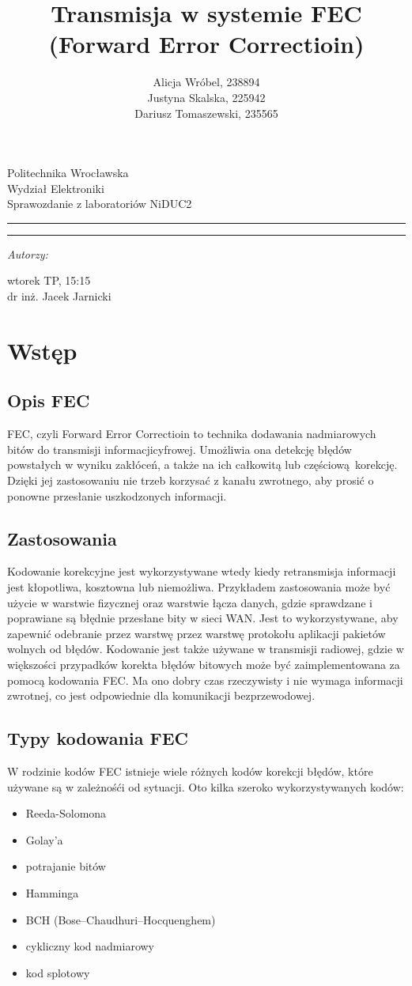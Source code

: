 \documentclass[12pt,a4paper,notitlepage]{report}
\author{Alicja Wróbel, 238894\\
    Justyna Skalska, 225942\\
    Dariusz Tomaszewski, 235565}
\title{Transmisja w systemie FEC\\
    (Forward Error Correctioin)}
\makeatletter
\newcommand{\linia}{\rule{\linewidth}{0.4mm}}
\renewcommand{\maketitle}{\begin{titlepage}
        \vspace*{1cm}
        \begin{center}\small
        Politechnika Wrocławska\\
        Wydział Elektroniki\\
        Sprawozdanie z laboratoriów NiDUC2
        \end{center}
        \vspace{3cm}
        \noindent\linia
        \begin{center}
          \LARGE \textsc{\@title}
             \end{center}
         \linia
        \vspace{0.5cm}
        \begin{flushright}
        \begin{minipage}{7cm}
        \textit{\small Autorzy:}\\
        \normalsize \textsc{\@author} \par
        \end{minipage}
        \vspace{5cm}

         {\small wtorek TP, 15:15}\\
            dr inż. Jacek Jarnicki
         \end{flushright}
        \vspace*{\stretch{6}}
        \begin{center}
        \@date
        \end{center}
      \end{titlepage}%
    }
\makeatother
\begin{document}
    \maketitle
    \tableofcontents
    \chapter{Wstęp}
    \section{Opis FEC}
    FEC, czyli Forward Error Correctioin to technika dodawania nadmiarowych bitów do transmisji informacjicyfrowej. Umożliwia ona detekcję błędów powstałych w wyniku zakłóceń, a także na ich całkowitą lub częściową korekcję. Dzięki jej zastosowaniu nie trzeb korzysać z kanału zwrotnego, aby prosić o ponowne przesłanie uszkodzonych informacji.
    \section{Zastosowania}
    Kodowanie korekcyjne jest wykorzystywane wtedy kiedy retransmisja informacji jest kłopotliwa, kosztowna lub niemożliwa. Przykładem zastosowania może być użycie w warstwie fizycznej oraz warstwie łącza danych, gdzie sprawdzane i poprawiane są błędnie przesłane bity w sieci WAN. Jest to wykorzystywane, aby zapewnić odebranie przez warstwę przez warstwę protokołu aplikacji pakietów wolnych od błędów. Kodowanie jest także używane w transmisji radiowej, gdzie w większości przypadków korekta błędów bitowych może być zaimplementowana za pomocą kodowania FEC. Ma ono dobry czas rzeczywisty i nie wymaga informacji zwrotnej, co jest odpowiednie dla komunikacji bezprzewodowej.
    \section{Typy kodowania FEC}
    W rodzinie kodów FEC istnieje wiele różnych kodów korekcji błędów, które używane są w zależnośći od sytuacji. Oto kilka szeroko wykorzystywanych kodów:
    \begin{itemize}
        \item Reeda-Solomona
        \item Golay'a
        \item potrajanie bitów
        \item Hamminga
        \item BCH (Bose–Chaudhuri–Hocquenghem)
        \item cykliczny kod nadmiarowy
        \item kod splotowy
    \end{itemize}
\end{document}
